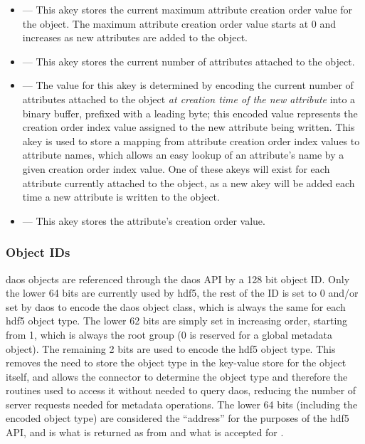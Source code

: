 \documentclass[../design_doc.tex]{subfiles}
\begin{document}
\begin{itemize}
 \item {} --- This \gls{akey} stores the current maximum attribute creation order value for the object. The maximum attribute creation order value starts at 0 and increases as new attributes are added to the object.
 \item {} --- This \gls{akey} stores the current number of attributes attached to the object.
 \item {} --- The value for this \gls{akey} is determined by encoding the current number of attributes attached to the object \textit{at creation time of the new attribute} into a binary buffer, prefixed with a leading  byte; this encoded value represents the creation order index value assigned to the new attribute being written. This \gls{akey} is used to store a mapping from attribute creation order index values to attribute names, which allows an easy lookup of an attribute's name by a given creation order index value. One of these \glspl{akey} will exist for each attribute currently attached to the object, as a new \gls{akey} will be added each time a new attribute is written to the object.
 \item {} --- This \gls{akey} stores the attribute's creation order value.
\end{itemize}


\newpage

\subsubsection{Object IDs}


\acrshort{daos} objects are referenced through the \acrshort{daos} API by a 128 bit object ID. Only the lower 64 bits are currently used by \acrshort{hdf5}, the rest of the ID is set to 0 and/or set by \acrshort{daos} to encode the \acrshort{daos} object class, which is always the same for each \acrshort{hdf5} object type. The lower 62 bits are simply set in increasing order, starting from 1, which is always the root group (0 is reserved for a global metadata object). The remaining 2 bits are used to encode the \acrshort{hdf5} object type. This
removes the need to store the object type in the key-value store for the object itself, and allows the \gls{connector} to determine the object type and therefore the routines used to access it without needed to query \acrshort{daos}, reducing the number of server requests needed for metadata operations. The lower 64 bits (including the encoded object type) are considered the “address” for the purposes of the \acrshort{hdf5} API, and is what is returned as  from  and what is accepted for .
\end{document}
